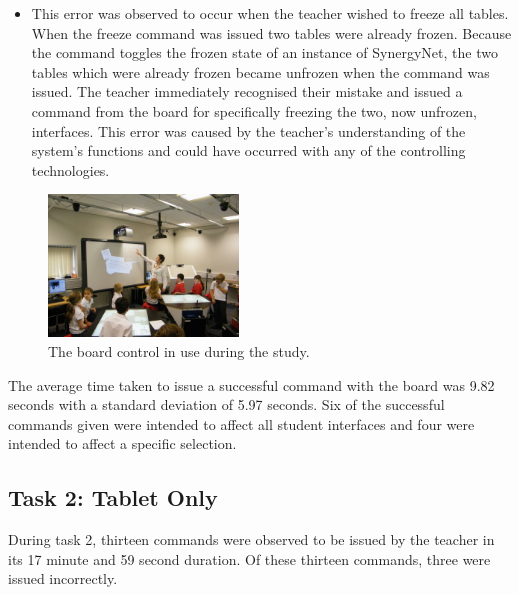 \documentclass[link]{IWCOMP}
\begin{document}
\begin{itemize}
\item This error was observed to occur when the teacher wished to freeze all tables.
When the freeze command was issued two tables were already frozen.
Because the command toggles the frozen state of an instance of SynergyNet, the two tables which were already frozen became unfrozen when the command was issued.
The teacher immediately recognised their mistake and issued a command from the board for specifically freezing the two, now unfrozen, interfaces.
This error was caused by the teacher's understanding of the system's functions and could have occurred with any of the controlling technologies.
\end{itemize}

\begin{figure}[h]
   \centering
   \includegraphics[width=0.45\textwidth]{figures/study_board.png}
   \caption{The board control in use during the study.}
   \label{fig:studyBoard}
\end{figure}

The average time taken to issue a successful command with the board was 9.82 seconds with a standard deviation of 5.97 seconds.
Six of the successful commands given were intended to affect all student interfaces and four were intended to affect a specific selection.

\subsection{Task 2: Tablet Only}
\label{subsec:resultsTask2}

During task 2, thirteen commands were observed to be issued by the teacher in its 17 minute and 59 second duration.
Of these thirteen commands, three were issued incorrectly.
\end{document}
